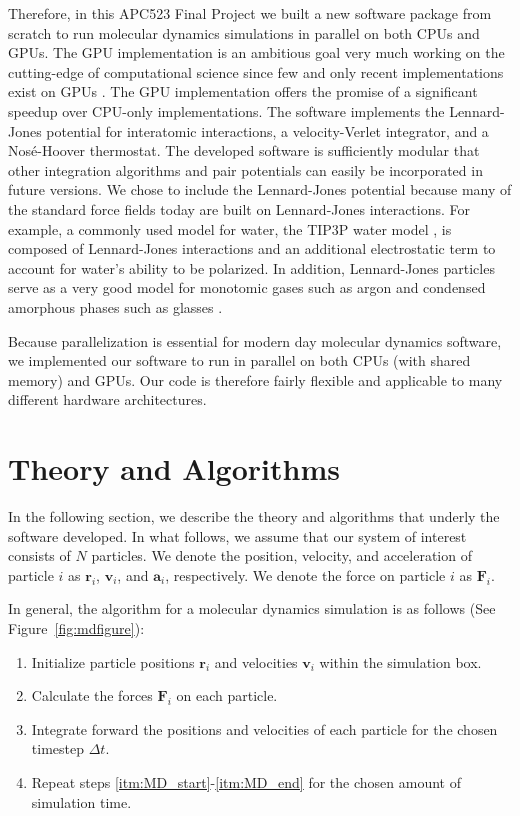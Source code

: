 Therefore, in this APC523 Final Project we built a new software package from scratch to run molecular dynamics simulations in parallel on both CPUs and GPUs. The GPU implementation is an ambitious goal very much working on the cutting-edge of computational science since few and only recent implementations exist on GPUs \cite{Anderson2008,Brown2012,Brown2011,Gotz2012,Salomon-Ferrer2013}.
%
The GPU implementation offers the promise of a significant speedup over CPU-only implementations.
%
The software implements the Lennard-Jones potential for interatomic interactions, a velocity-Verlet integrator, and a Nos\'{e}-Hoover thermostat. The developed software is sufficiently modular that other integration algorithms and pair potentials can easily be incorporated in future versions.
%
We chose to include the Lennard-Jones potential because many of the standard force fields \cite{Case2010,MacKerell1998,Scott1999,Kaminski2001,Arnautova2006,Khoury2013} today are built on Lennard-Jones interactions.
%
For example, a commonly used model for water, the TIP3P water model \cite{Jorgensen1983}, is composed of Lennard-Jones interactions and an additional electrostatic term to account for water's ability to be polarized.
%
In addition, Lennard-Jones particles serve as a very good model for monotomic gases such as argon \cite{Rahman1964} and condensed amorphous phases such as glasses \cite{Debenedetti2001}.

Because parallelization is essential for modern day molecular dynamics software, we implemented our software to run in parallel on both CPUs (with shared memory) and GPUs.
%
Our code is therefore fairly flexible and applicable to many different hardware architectures.

\section{Theory and Algorithms}

In the following section, we describe the theory and algorithms that underly the software developed.
%
In what follows, we assume that our system of interest consists of $N$ particles.
%
We denote the position, velocity, and acceleration of particle $i$ as $\mathbf{r}_i$, $\mathbf{v}_i$, and $\mathbf{a}_i$, respectively.
%
We denote the force on particle $i$ as $\mathbf{F}_i$.

In general, the algorithm for a molecular dynamics simulation is as follows (See Figure~\ref{fig:mdfigure}):
\begin{enumerate}
\item Initialize particle positions $\mathbf{r}_i$ and velocities $\mathbf{v}_i$ within the simulation box.
\item  \label{itm:MD_start} Calculate the forces $\mathbf{F}_i$ on each particle.
\item \label{itm:MD_end} Integrate forward the positions and velocities of each particle for the chosen timestep $\Delta t$.
\item Repeat steps \ref{itm:MD_start}-\ref{itm:MD_end} for the chosen amount of simulation time.
\end{enumerate}

